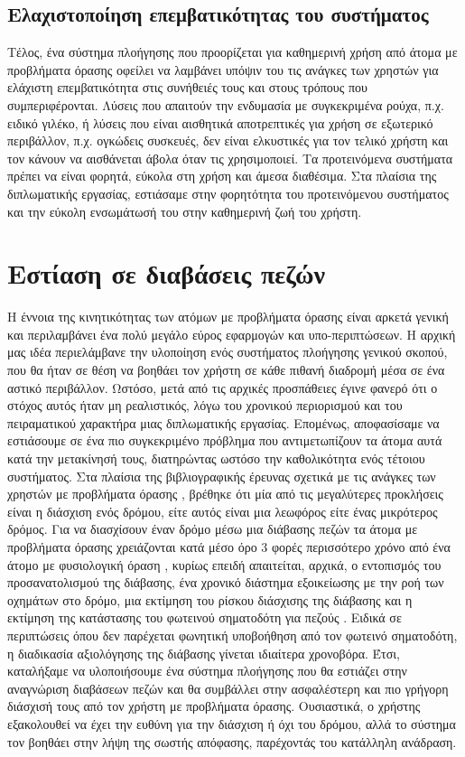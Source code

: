 \subsection{Ελαχιστοποίηση επεμβατικότητας του συστήματος}
Τέλος, ένα σύστημα πλοήγησης που προορίζεται για καθημερινή χρήση από άτομα με προβλήματα όρασης οφείλει να λαμβάνει υπόψιν του τις ανάγκες των χρηστών για ελάχιστη επεμβατικότητα στις συνήθειές τους και στους τρόπους που συμπεριφέρονται. Λύσεις που απαιτούν την ενδυμασία με συγκεκριμένα ρούχα, π.χ. ειδικό γιλέκο, ή λύσεις που είναι αισθητικά αποτρεπτικές για χρήση σε εξωτερικό περιβάλλον, π.χ. ογκώδεις συσκευές, δεν είναι ελκυστικές για τον τελικό χρήστη και τον κάνουν να αισθάνεται άβολα όταν τις χρησιμοποιεί. Τα προτεινόμενα συστήματα πρέπει να είναι φορητά, εύκολα στη χρήση και άμεσα διαθέσιμα. Στα πλαίσια της διπλωματικής εργασίας, εστιάσαμε στην φορητότητα του προτεινόμενου συστήματος και την εύκολη ενσωμάτωσή του στην καθημερινή ζωή του χρήστη.

\section{Εστίαση σε διαβάσεις πεζών}
Η έννοια της κινητικότητας των ατόμων με προβλήματα όρασης είναι αρκετά γενική και περιλαμβάνει ένα πολύ μεγάλο εύρος εφαρμογών και υπο-περιπτώσεων. Η αρχική μας ιδέα περιελάμβανε την υλοποίηση ενός συστήματος πλοήγησης γενικού σκοπού, που θα ήταν σε θέση να βοηθάει τον χρήστη σε κάθε πιθανή διαδρομή μέσα σε ένα αστικό περιβάλλον. Ωστόσο, μετά από τις αρχικές προσπάθειες έγινε φανερό ότι ο στόχος αυτός ήταν μη ρεαλιστικός, λόγω του χρονικού περιορισμού και του πειραματικού χαρακτήρα μιας διπλωματικής εργασίας. Επομένως, αποφασίσαμε να εστιάσουμε σε ένα πιο συγκεκριμένο πρόβλημα που αντιμετωπίζουν τα άτομα αυτά κατά την μετακίνησή τους, διατηρώντας ωστόσο την καθολικότητα ενός τέτοιου συστήματος. Στα πλαίσια της βιβλιογραφικής έρευνας σχετικά με τις ανάγκες των χρηστών με προβλήματα όρασης \cite{saitis2016identifying, riazi_outdoor_2016}, βρέθηκε ότι μία από τις μεγαλύτερες προκλήσεις είναι η διάσχιση ενός δρόμου, είτε αυτός είναι μια λεωφόρος είτε ένας μικρότερος δρόμος. Για να διασχίσουν έναν δρόμο μέσω μια διάβασης πεζών τα άτομα με προβλήματα όρασης χρειάζονται κατά μέσο όρο 3 φορές περισσότερο χρόνο από ένα άτομο με φυσιολογική όραση \cite{ashmead2005street}, κυρίως επειδή απαιτείται, αρχικά, ο εντοπισμός του προσανατολισμού της διάβασης, ένα χρονικό διάστημα εξοικείωσης με την ροή των οχημάτων στο δρόμο, μια εκτίμηση του ρίσκου διάσχισης της διάβασης και η εκτίμηση της κατάστασης του φωτεινού σηματοδότη για πεζούς \cite{Accessib15:online}. Ειδικά σε περιπτώσεις όπου δεν παρέχεται φωνητική υποβοήθηση από τον φωτεινό σηματοδότη, η διαδικασία αξιολόγησης της διάβασης γίνεται ιδιαίτερα χρονοβόρα. Έτσι, καταλήξαμε να υλοποιήσουμε ένα σύστημα πλοήγησης που θα εστιάζει στην αναγνώριση διαβάσεων πεζών και θα συμβάλλει στην ασφαλέστερη και πιο γρήγορη διάσχισή τους από τον χρήστη με προβλήματα όρασης. Ουσιαστικά, ο χρήστης εξακολουθεί να έχει την ευθύνη για την διάσχιση ή όχι του δρόμου, αλλά το σύστημα τον βοηθάει στην λήψη της σωστής απόφασης, παρέχοντάς του κατάλληλη ανάδραση.

